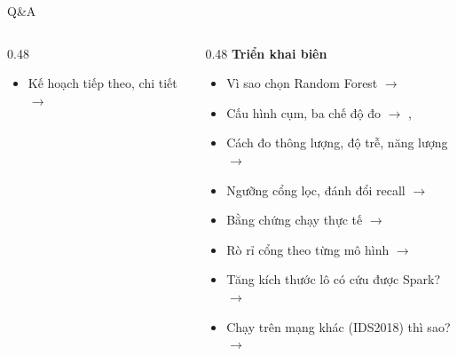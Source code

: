 \documentclass[aspectratio=169, 11pt]{beamer}
\begin{document}
\begin{frame}{Q\&A}
\begin{columns}[T]
\begin{column}{0.48\textwidth}
\begin{itemize}
        \item[\key{Q12}] Kế hoạch tiếp theo, chi tiết
              $\rightarrow$ \hyperlink{bk-future}{}
      \end{itemize}
    \end{column}
    \begin{column}{0.48\textwidth}
      \textbf{Triển khai biên}
      \begin{itemize}
        \item[\key{Q7}] Vì sao chọn Random Forest
              $\rightarrow$ \hyperlink{bk-rf}{}
        \item[\key{Q8}] Cấu hình cụm, ba chế độ đo
              $\rightarrow$ \hyperlink{bk-modes}{},
              \hyperlink{bk-cluster}{}
        \item[\key{Q9}] Cách đo thông lượng, độ trễ, năng lượng
              $\rightarrow$ \hyperlink{bk-protocol}{}
        \item[\key{Q10}] Ngưỡng cổng lọc, đánh đổi recall
              $\rightarrow$ \hyperlink{bk-gate}{}
        \item[\key{Q11}] Bằng chứng chạy thực tế
              $\rightarrow$ \hyperlink{bk-grafana}{}
        \item[\key{Q13}] Rò rỉ cổng theo từng mô hình
              $\rightarrow$ \hyperlink{bk-portmodels}{}
        \item[\key{Q14}] Tăng kích thước lô có cứu được Spark?
              $\rightarrow$ \hyperlink{bk-batch}{}
        \item[\key{Q15}] Chạy trên mạng khác (IDS2018) thì sao?
              $\rightarrow$ \hyperlink{bk-edge2018}{}
      \end{itemize}
    \end{column}
  \end{columns}
\end{frame}
\end{document}
